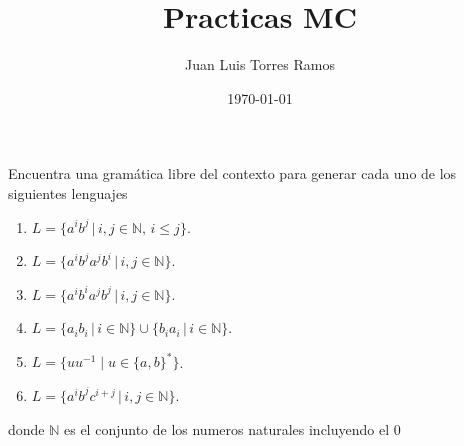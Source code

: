 \documentclass{article}
\title{Practicas MC}
\date{\today}
\author{Juan Luis Torres Ramos}
\begin{document}
    \maketitle
    \newpage

    \section{}
    Encuentra una gramática libre del contexto para generar cada uno de los siguientes lenguajes


    \begin{enumerate}
        \item $L = \{a^i b^j \, | \, i, j \in \mathbb{N}, \, i \leq j\}$.
        \item $L = \{a^i b^j a^j b^i \, | \, i, j \in \mathbb{N}\}$.
        \item $L = \{a^i b^i a^j b^j \, | \, i, j \in \mathbb{N}\}$.
        \item $L = \{a_i b_i \,|\, i \in \mathbb{N}\} \cup \{b_i a_i \,|\, i \in \mathbb{N\}}$.
        \item $L = \{uu^{-1} \mid u \in \{a, b\}^*\}$.
        \item $L = \{a^i b^j c^{i+j} \, | \, i, j \in \mathbb{N}\}$.    
    \end{enumerate}

    \begin{flushleft}
        donde $\mathbb{N}$ es el conjunto de los numeros naturales incluyendo el 0
    \end{flushleft}

    
\end{document}
